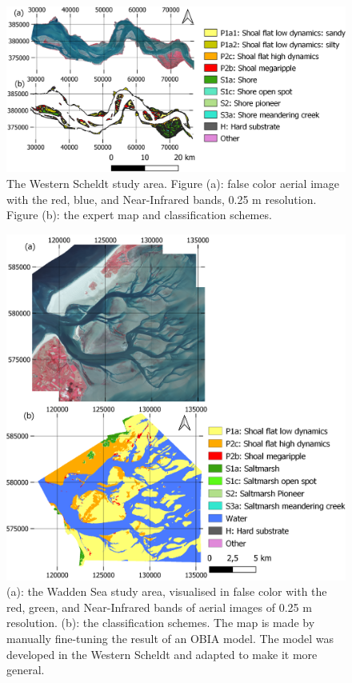\documentclass{isprs} %
\begin{document}
\begin{figure}
    \centering
    \includegraphics[scale=0.4]{figures/westernscheldt_overview.png}
    \caption{The Western Scheldt study area. Figure (a): false color aerial image with the red, blue, and Near-Infrared bands, 0.25 m resolution. Figure (b): the expert map and classification schemes.}
    \label{fig:ws_o}
\end{figure}

\begin{figure}[!h]
    \centering
    \includegraphics[scale=0.4]{figures/false_classificationvertical.png}
    \caption{(a): the Wadden Sea study area, visualised in false color with the red, green, and Near-Infrared bands of aerial images of 0.25 m resolution. (b): the classification schemes. The map is made by manually fine-tuning the result of an OBIA model. The model was developed in the Western Scheldt and adapted to make it more general. }
    \label{fig:wadden}
\end{figure}
\end{document}
